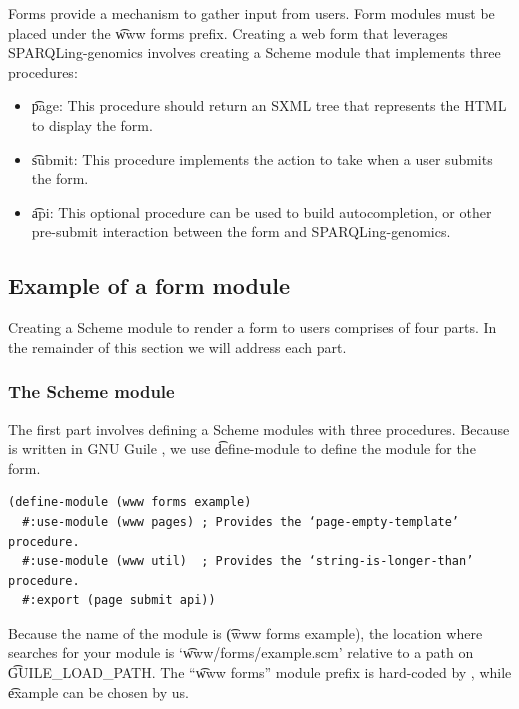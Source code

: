   Forms provide a mechanism to gather input from users.  Form modules must be
  placed under the \t{www forms} prefix.  Creating a web form that leverages
  SPARQLing-genomics involves creating a Scheme module that implements three
  procedures:
  \begin{itemize}
  \item \t{page}: This procedure should return an SXML tree that represents
    the HTML to display the form.
  \item \t{submit}: This procedure implements the action to take when a user
    submits the form.
  \item \t{api}: This optional procedure can be used to build autocompletion,
    or other pre-submit interaction between the form and SPARQLing-genomics.
  \end{itemize}

\subsection{Example of a form module}

  Creating a Scheme module to render a form to users comprises of four
  parts.  In the remainder of this section we will address each part.

\subsubsection{The Scheme module}
\label{sec:scheme-module}

  The first part involves defining a Scheme modules with three procedures.
  Because  is written in GNU Guile \citep{guile},
  we use \t{define-module} to define the module for the form.

\begin{siderules}
\begin{verbatim}
(define-module (www forms example)
  #:use-module (www pages) ; Provides the ‘page-empty-template’ procedure.
  #:use-module (www util)  ; Provides the ‘string-is-longer-than’ procedure.
  #:export (page submit api))
\end{verbatim}
\end{siderules}

  Because the name of the module is \t{(www forms example)}, the location
  where  searches for your module is `\t{www/forms/example.scm}'
  relative to a path on \t{GUILE\_LOAD\_PATH}.  The ``\t{www forms}'' module
  prefix is hard-coded by , while \t{example} can be chosen by
  us.

